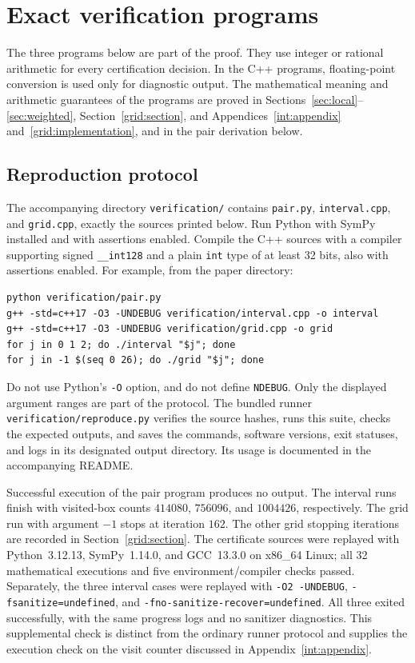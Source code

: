 \section{Exact verification programs}\label{app:certificates}
The three programs below are part of the proof. They use integer or
rational arithmetic for every certification decision. In the C++ programs,
floating-point conversion is used only for diagnostic output.
The mathematical meaning and arithmetic guarantees of the programs are
proved in Sections~\ref{sec:local}--\ref{sec:weighted},
Section~\ref{grid:section}, and
Appendices~\ref{int:appendix} and~\ref{grid:implementation}, and in
the pair derivation below.

\subsection*{Reproduction protocol}
The accompanying directory \texttt{verification/} contains
\texttt{pair.py}, \texttt{interval.cpp}, and \texttt{grid.cpp},
exactly the sources printed below. Run Python with SymPy installed
and with assertions enabled. Compile the C++ sources with a compiler
supporting signed \texttt{\_\_int128} and a plain \texttt{int} type of
at least 32 bits, also with assertions enabled.
For example, from the paper directory:
\begin{lstlisting}[numbers=none]
python verification/pair.py
g++ -std=c++17 -O3 -UNDEBUG verification/interval.cpp -o interval
g++ -std=c++17 -O3 -UNDEBUG verification/grid.cpp -o grid
for j in 0 1 2; do ./interval "$j"; done
for j in -1 $(seq 0 26); do ./grid "$j"; done
\end{lstlisting}
Do not use Python's \texttt{-O} option, and do not define \texttt{NDEBUG}.
Only the displayed argument ranges are part of the protocol.
The bundled runner \nolinkurl{verification/reproduce.py} verifies the source
hashes, runs this suite, checks the expected outputs, and saves the
commands, software versions, exit statuses, and logs in its designated
output directory. Its usage is documented in the accompanying README.

Successful execution of the pair program produces no output.
The interval runs finish with visited-box counts
$414080$, $756096$, and $1004426$, respectively.
The grid run with argument $-1$ stops at iteration $162$.
The other grid stopping iterations are recorded in
Section~\ref{grid:section}.
The certificate sources were replayed with Python~3.12.13,
SymPy~1.14.0, and GCC~13.3.0 on x86\_64 Linux; all 32 mathematical
executions and five environment/compiler checks passed. Separately, the
three interval cases were replayed with \texttt{-O2 -UNDEBUG},
\texttt{-fsanitize=undefined}, and
\texttt{-fno-sanitize-recover=undefined}. All three exited successfully,
with the same progress logs and no sanitizer diagnostics. This supplemental
check is distinct from the ordinary runner protocol and supplies the
execution check on the visit counter discussed in
Appendix~\ref{int:appendix}.


